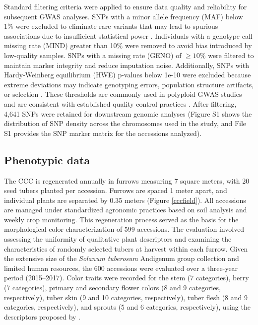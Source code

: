 \documentclass[pdflatex,sn-mathphys-ay]{sn-jnl}%
\begin{document}

Standard filtering criteria were applied to ensure data quality and reliability for subsequent GWAS analyses. SNPs with a minor allele frequency (MAF) below 1\% were excluded to eliminate rare variants that may lead to spurious associations due to insufficient statistical power \citep{Anderson2010}. Individuals with a genotype call missing rate (MIND) greater than 10\% were removed to avoid bias introduced by low-quality samples. SNPs with a missing rate (GENO) of $\geq 10\%$ were filtered to maintain marker integrity and reduce imputation noise. Additionally, SNPs with Hardy-Weinberg equilibrium (HWE) p-values below 1e-10 were excluded because extreme deviations may indicate genotyping errors, population structure artifacts, or selection \citep{Wigginton2005}.  These thresholds are commonly used in polyploid GWAS studies and are consistent with established quality control practices \citep{Lu2013,Pavan2020}. After filtering, 4,641 SNPs were retained for downstream genomic analyses (Figure S1 shows the distribution of SNP density across the chromosomes used in the study, and File S1 provides the SNP marker matrix for the accessions analyzed).



\subsection{Phenotypic data }




The CCC is regenerated annually in furrows measuring 7 square meters, with 20 seed tubers planted per accession. Furrows are spaced 1 meter apart, and individual plants are separated by 0.35 meters (Figure \ref{cccfield}). All accessions are managed under standardized agronomic practices based on soil analysis and weekly crop monitoring. This regeneration process served as the basis for the morphological color characterization of 599 accessions. The evaluation involved assessing the uniformity of qualitative plant descriptors and examining the characteristics of randomly selected tubers at harvest within each furrow. Given the extensive size of the \textit{Solanum tuberosum} Andigenum group collection and limited human resources, the 600 accessions were evaluated over a three-year period (2015–2017). Color traits were recorded for the stem (7 categories), berry (7 categories), primary and secondary flower colors (8 and 9 categories, respectively), tuber skin (9 and 10 categories, respectively), tuber flesh (8 and 9 categories, respectively), and sprouts (5 and 6 categories, respectively), using the descriptors proposed by \cite{gomez2000guia}. 
\end{document}
